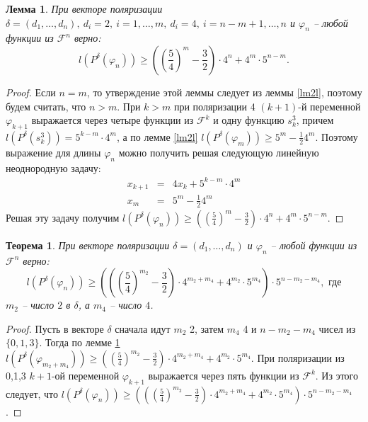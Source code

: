 \documentclass[bibliography=totoc, a4paper, 14pt]{extarticle}
\newtheorem{myth}{Теорема}
\newtheorem{mylm}{Лемма}
\newtheorem*{myco}{Следствие}
\newcommand{\pphi}[1] {P^{\delta}(\varphi_{#1})}
\begin{document}
\begin{mylm}
\label{lm24l}
При векторе поляризации $\delta=(d_1,\dots,d_n),\ d_i = 2,\ i=1,\dots,m,\ d_i=4,{\ i=n-m+1,\dots,n}$
и $\varphi_n$ -- любой функции из $\mathcal{F}^n$ верно:
$$l(\pphi{n})\geqslant\left(\left(\frac{5}{4}\right)^m-\frac{3}{2}\right)\cdot4^n+4^m\cdot5^{n-m}.$$
\end{mylm}
\begin{proof}
Если $n=m$, то утверждение этой леммы следует из леммы \ref{lm2l}, поэтому будем считать, что $n>m$.
При $k > m$ при поляризации 4 $(k+1)$-й переменной $\varphi_{k+1}$ выражается через четыре функции
из $\mathcal{F}^k$ и одну функцию $s^3_k$, причем $l(P^{\delta}(s^3_k)) = 5^{k-m} \cdot 4^m$, а по
лемме \ref{lm2l} $l(\pphi{m}) \geqslant 5^m - \frac{1}{2}4^m$. Поэтому выражение для длины
$\varphi_n$ можно получить решая следующую линейную неоднородную задачу:
$$ \begin{array}{lcl}
x_{k+1} &=& 4 x_k + 5^{k-m}\cdot 4^m \\
x_m     &=& 5^m - \frac{1}{2}4^m
\end{array} $$
Решая эту задачу получим $l(\pphi{n}) \geqslant \left(\left(\frac{5}{4}\right)^m -
    \frac{3}{2}\right)\cdot 4^n + 4^m \cdot 5^{n-m}$.
\end{proof}

\begin{myth}
При векторе поляризации $\delta=(d_1,\dots,d_n)$ и $\varphi_n$ -- любой функции из
$\mathcal{F}^n$ верно: $$l(\pphi{n}) \geqslant \left(\left(\left(\frac{5}{4}\right)^{m_2}-
\frac{3}{2}\right) \cdot 4^{m_2+m_4}+4^{m_2}\cdot 5^{m_4} \right) \cdot 5^{n-m_2-m_4},\text{ где}$$
$m_2$ -- число $2$ в $\delta$, а $m_4$ -- число $4$.
\end{myth}
\begin{proof}
Пусть в векторе $\delta$ сначала идут $m_2$ 2, затем $m_4$ 4 и $n-m_2-m_4$ чисел из $\{0,1,3\}$.
Тогда по лемме \ref{lm24l} $l(\pphi{m_2+m_4}) \geqslant \left(\left(\frac{5}{4}\right)^{m_2}
- \frac{3}{2}\right)\cdot 4^{m_2+m_4} + 4^{m_2} \cdot 5^{m_4}$. При поляризации из {0,1,3} $k+1$-ой
переменной $\varphi_{k+1}$ выражается через пять функции из $\mathcal{F}^k$. Из этого следует, что
${l(\pphi{n}) \geqslant \left(\left(\left(\frac{5}{4}\right)^{m_2}-\frac{3}{2}\right) \cdot
4^{m_2+m_4}+4^{m_2} \cdot 5^{m_4} \right) \cdot 5^{n-m_2-m_4}}$.
\end{proof}

\end{document}
